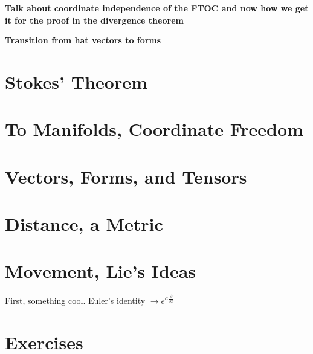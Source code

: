 \documentclass[../master.tex]{subfiles}
\begin{document}
	\textbf{Talk about coordinate independence of the FTOC and now how we get it for the proof in the divergence theorem}

	\textbf{Transition from hat vectors to forms}

\section{Stokes' Theorem}

\section{To Manifolds, Coordinate Freedom}

\section{Vectors, Forms, and Tensors}

\section{Distance, a Metric}

\section{Movement, Lie's Ideas}

	First, something cool. Euler's identity $\rightarrow e^{a \frac{\partial}{\partial x}}$

\section{Exercises}
\end{document}
